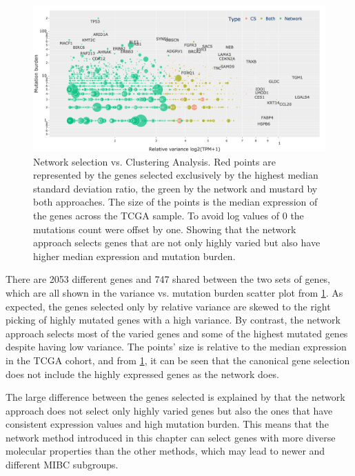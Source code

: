 \begin{figure}[!t]    
    \centering\includegraphics[width=1.0\textwidth,keepaspectratio]{Sections/Network_I/Resources/Tum_network/ClusteringAnalysis_vs_Network_3.png}
    \caption[Gene selection: network vs clustering analysis]{Network selection vs. Clustering Analysis. Red points are represented by the genes selected exclusively by the highest median standard deviation ratio, the green by the network and mustard by both approaches. The size of the points is the median expression of the genes across the TCGA sample. To avoid log values of 0 the mutations count were offset by one. Showing that the network approach selects genes that are not only highly varied but also have higher median expression and mutation burden.}
    \label{fig:N_I:network_ca_selection}
\end{figure}

There are 2053 different genes and 747 shared between the two sets of genes, which are all shown in the variance vs. mutation burden scatter plot from \cref{fig:N_I:network_ca_selection}. As expected, the genes selected only by relative variance are skewed to the right picking of highly mutated genes with a high variance. By contrast, the network approach selects most of the varied genes and some of the highest mutated genes despite having low variance. The points' size is relative to the median expression in the TCGA cohort, and from   \cref{fig:N_I:network_ca_selection}, it can be seen that the canonical gene selection does not include the highly expressed genes as the network does.

The large difference between the genes selected is explained by that the network approach does not select only highly varied genes but also the ones that have consistent expression values and high mutation burden. This means that the network method introduced in this chapter can select genes with more diverse molecular properties than the other methods, which may lead to newer and different MIBC subgroups.


